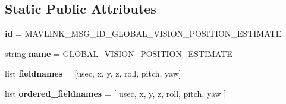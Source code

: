 \subsection*{Static Public Attributes}
\begin{DoxyCompactItemize}
\item 
\mbox{\label{classpymavlink_1_1dialects_1_1v10_1_1MAVLink__global__vision__position__estimate__message_a78ca193c46b5a1a680bb414117be5cad}} 
{\bfseries id} = M\+A\+V\+L\+I\+N\+K\+\_\+\+M\+S\+G\+\_\+\+I\+D\+\_\+\+G\+L\+O\+B\+A\+L\+\_\+\+V\+I\+S\+I\+O\+N\+\_\+\+P\+O\+S\+I\+T\+I\+O\+N\+\_\+\+E\+S\+T\+I\+M\+A\+TE
\item 
\mbox{\label{classpymavlink_1_1dialects_1_1v10_1_1MAVLink__global__vision__position__estimate__message_aa43f1a568041ab97f5788f1ebc2df41a}} 
string {\bfseries name} = \textquotesingle{}G\+L\+O\+B\+A\+L\+\_\+\+V\+I\+S\+I\+O\+N\+\_\+\+P\+O\+S\+I\+T\+I\+O\+N\+\_\+\+E\+S\+T\+I\+M\+A\+TE\textquotesingle{}
\item 
\mbox{\label{classpymavlink_1_1dialects_1_1v10_1_1MAVLink__global__vision__position__estimate__message_a0600b23cc0232ceecf418b116160f607}} 
list {\bfseries fieldnames} = \mbox{[}\textquotesingle{}usec\textquotesingle{}, \textquotesingle{}x\textquotesingle{}, \textquotesingle{}y\textquotesingle{}, \textquotesingle{}z\textquotesingle{}, \textquotesingle{}roll\textquotesingle{}, \textquotesingle{}pitch\textquotesingle{}, \textquotesingle{}yaw\textquotesingle{}\mbox{]}
\item 
\mbox{\label{classpymavlink_1_1dialects_1_1v10_1_1MAVLink__global__vision__position__estimate__message_aaa9248ee70afec82185bf1f714b9bac3}} 
list {\bfseries ordered\+\_\+fieldnames} = \mbox{[} \textquotesingle{}usec\textquotesingle{}, \textquotesingle{}x\textquotesingle{}, \textquotesingle{}y\textquotesingle{}, \textquotesingle{}z\textquotesingle{}, \textquotesingle{}roll\textquotesingle{}, \textquotesingle{}pitch\textquotesingle{}, \textquotesingle{}yaw\textquotesingle{} \mbox{]}
\item 

\end{DoxyCompactItemize}

